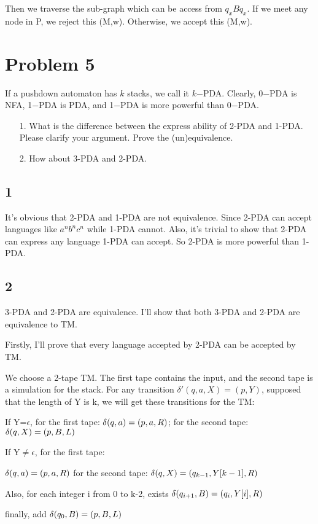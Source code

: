 \documentclass[a4paper,UTF8]{ctexart}
\theoremstyle{definition}
\begin{document}
Then we traverse the sub-graph which can be access from $q_xBq_x$. If we meet any node in P,
we reject this (M,w). Otherwise, we accept this (M,w).

\newpage

\section*{Problem 5}
If a pushdown automaton has $k$ stacks, we call it $k$−PDA. Clearly, 0−PDA is NFA, 1−PDA is PDA, and 1−PDA is more powerful than 0−PDA.
\begin{enumerate}
  \item[1.] What is the difference between the express ability of 2-PDA and 1-PDA. Please clarify your argument. Prove the (un)equivalence.
  \item[2.] How about 3-PDA and 2-PDA.
\end{enumerate}

\subsection*{1}
It's obvious that 2-PDA and 1-PDA are not equivalence. Since 2-PDA can accept languages like $a^nb^nc^n$
while 1-PDA cannot. Also, it's trivial to show that 2-PDA can express any language 1-PDA can accept.
So 2-PDA is more powerful than 1-PDA.

\subsection*{2}
3-PDA and 2-PDA are equivalence.
I'll show that both 3-PDA and 2-PDA are equivalence to TM.

Firstly, I'll prove that every language accepted by 2-PDA can be accepted by TM.

We choose a 2-tape TM. The first tape contains the input, and the second tape is a simulation for the stack.
For any transition $\delta'(q,a,X)=(p,Y)$, supposed that the length of 
Y is k, we will get these transitions for the TM:

If Y=$\epsilon$, for the first tape: $\delta(q,a)=(p,a,R)$; 
for the second tape: $\delta(q,X)=(p,B,L)$

If Y$\ne \epsilon$, for the first tape:

$\delta(q,a)=(p,a,R)$
for the second tape: $\delta(q,X)=(q_{k-1},Y[k-1],R)$

Also, for each integer i from 0 to k-2, exists $\delta(q_{i+1},B)=(q_{i},Y[i],R)$

finally, add $\delta(q_0,B)=(p,B,L)$
\end{document}
